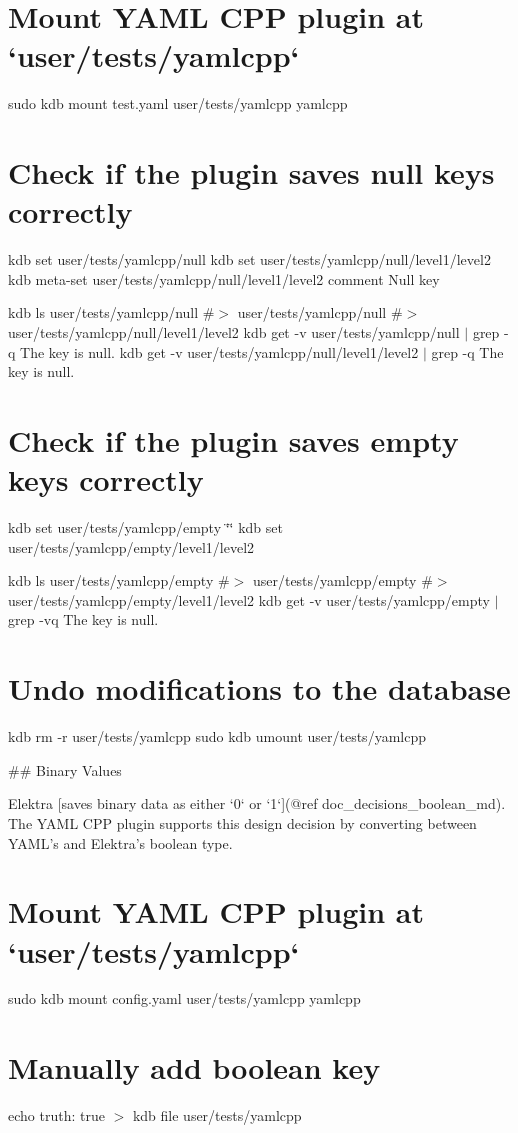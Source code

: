  \hypertarget{autotoc_md865_autotoc_md928}{}\section{Mount Y\+A\+M\+L C\+P\+P plugin at `user/tests/yamlcpp`}\label{autotoc_md865_autotoc_md928}
sudo kdb mount test.\+yaml user/tests/yamlcpp yamlcpp\hypertarget{autotoc_md865_autotoc_md929}{}\section{Check if the plugin saves null keys correctly}\label{autotoc_md865_autotoc_md929}
kdb set user/tests/yamlcpp/null kdb set user/tests/yamlcpp/null/level1/level2 kdb meta-\/set user/tests/yamlcpp/null/level1/level2 comment \textquotesingle{}Null key\textquotesingle{}

kdb ls user/tests/yamlcpp/null \#$>$ user/tests/yamlcpp/null \#$>$ user/tests/yamlcpp/null/level1/level2 kdb get -\/v user/tests/yamlcpp/null $\vert$ grep -\/q \textquotesingle{}The key is null.\textquotesingle{} kdb get -\/v user/tests/yamlcpp/null/level1/level2 $\vert$ grep -\/q \textquotesingle{}The key is null.\textquotesingle{}\hypertarget{autotoc_md865_autotoc_md930}{}\section{Check if the plugin saves empty keys correctly}\label{autotoc_md865_autotoc_md930}
kdb set user/tests/yamlcpp/empty \char`\"{}\char`\"{} kdb set user/tests/yamlcpp/empty/level1/level2

kdb ls user/tests/yamlcpp/empty \#$>$ user/tests/yamlcpp/empty \#$>$ user/tests/yamlcpp/empty/level1/level2 kdb get -\/v user/tests/yamlcpp/empty $\vert$ grep -\/vq \textquotesingle{}The key is null.\textquotesingle{}\hypertarget{autotoc_md865_autotoc_md931}{}\section{Undo modifications to the database}\label{autotoc_md865_autotoc_md931}
kdb rm -\/r user/tests/yamlcpp sudo kdb umount user/tests/yamlcpp 
\begin{DoxyCode}
## Binary Values

Elektra [saves binary data as either `0` or `1`](@ref doc\_decisions\_boolean\_md). The YAML CPP plugin
       supports this design decision by converting between YAML’s and Elektra’s boolean type.
\end{DoxyCode}
 \hypertarget{autotoc_md865_autotoc_md932}{}\section{Mount Y\+A\+M\+L C\+P\+P plugin at `user/tests/yamlcpp`}\label{autotoc_md865_autotoc_md932}
sudo kdb mount config.\+yaml user/tests/yamlcpp yamlcpp \hypertarget{autotoc_md865_autotoc_md933}{}\section{Manually add boolean key}\label{autotoc_md865_autotoc_md933}
echo \textquotesingle{}truth\+: true\textquotesingle{} $>$ {\ttfamily kdb file user/tests/yamlcpp}

